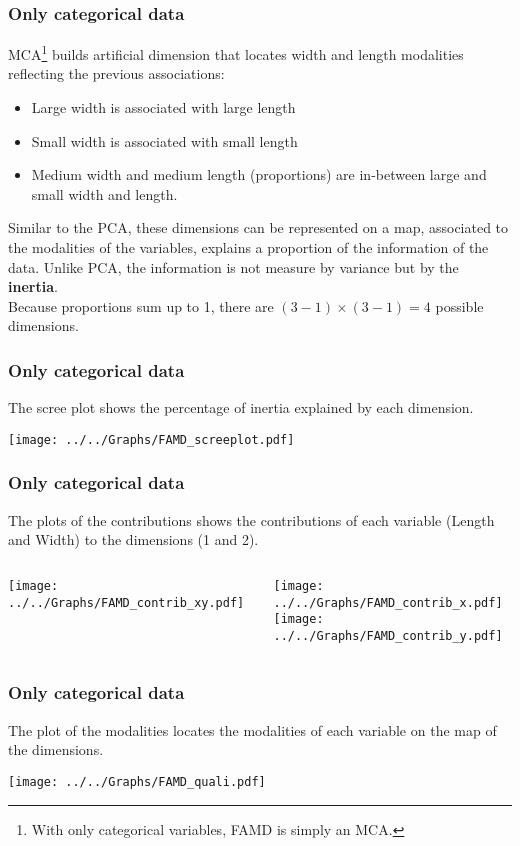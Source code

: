 \begin{frame}
\frametitle{Only categorical data}
MCA\footnote{With only categorical variables, FAMD is simply an MCA.} builds artificial dimension that locates width and length modalities reflecting the previous associations:
\begin{itemize}
\item Large width is associated with large length
\item Small width is associated with small length
\item Medium width and medium length (proportions) are in-between large and small width and length.
\end{itemize}
Similar to the PCA, these dimensions can be represented on a map, associated to the modalities of the variables, explains a proportion of the information of the data. Unlike PCA, the information is not measure by variance but by the {\bf inertia}.\\
\vspace{0.3cm}
Because proportions sum up to 1, there are $(3-1)\times (3-1) = 4$ possible dimensions. 
\end{frame}
\begin{frame}
\frametitle{Only categorical data}
The scree plot shows the percentage of inertia explained by each dimension.
\begin{center}
\texttt{[image: ../../Graphs/FAMD\_screeplot.pdf]}
\end{center}
\end{frame}
\begin{frame}
\frametitle{Only categorical data}
\small
The plots of the contributions shows the contributions of each variable (Length and Width) to the dimensions (1 and 2).
\normalsize
\begin{columns}
\begin{column}{0.55\textwidth}
\texttt{[image: ../../Graphs/FAMD\_contrib\_xy.pdf]}
\end{column}
\begin{column}{0.45\textwidth}
\texttt{[image: ../../Graphs/FAMD\_contrib\_x.pdf]}\\
\texttt{[image: ../../Graphs/FAMD\_contrib\_y.pdf]}
\end{column}
\end{columns}
\end{frame}
\begin{frame}
\frametitle{Only categorical data}
The plot of the modalities locates the modalities of each variable on the map of the dimensions.
\begin{center}
\texttt{[image: ../../Graphs/FAMD\_quali.pdf]}
\end{center}
\end{frame}
